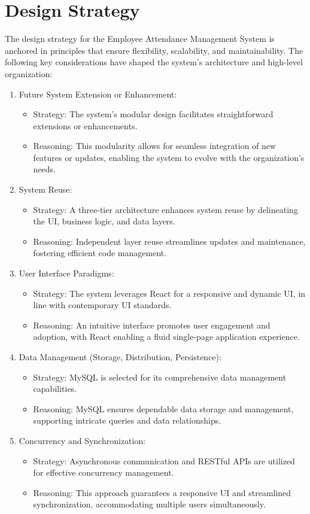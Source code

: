 \documentclass[a4paper, 12pt]{article}
\begin{document}
\section{Design Strategy}
The design strategy for the Employee Attendance Management System is anchored in principles that ensure flexibility, scalability, and maintainability. The following key considerations have shaped the system’s architecture and high-level organization:
\begin{enumerate}
    \item Future System Extension or Enhancement:
    \begin{itemize}
        \item Strategy: The system’s modular design facilitates straightforward extensions or enhancements.
        \item Reasoning: This modularity allows for seamless integration of new features or updates, enabling the system to evolve with the organization’s needs.
    \end{itemize}
    \item System Reuse:
    \begin{itemize}
        \item Strategy: A three-tier architecture enhances system reuse by delineating the UI, business logic, and data layers.
        \item Reasoning: Independent layer reuse streamlines updates and maintenance, fostering efficient code management.
    \end{itemize}
    \item User Interface Paradigms:
    \begin{itemize}
        \item Strategy: The system leverages React for a responsive and dynamic UI, in line with contemporary UI standards.
        \item Reasoning: An intuitive interface promotes user engagement and adoption, with React enabling a fluid single-page application experience.
    \end{itemize}
    \item Data Management (Storage, Distribution, Persistence):
    \begin{itemize}
        \item Strategy: MySQL is selected for its comprehensive data management capabilities.
        \item Reasoning: MySQL ensures dependable data storage and management, supporting intricate queries and data relationships.
    \end{itemize}
    \item Concurrency and Synchronization:
    \begin{itemize}
        \item Strategy: Asynchronous communication and RESTful APIs are utilized for effective concurrency management.
        \item Reasoning: This approach guarantees a responsive UI and streamlined synchronization, accommodating multiple users simultaneously.
    \end{itemize}
\end{enumerate}
\end{document}
